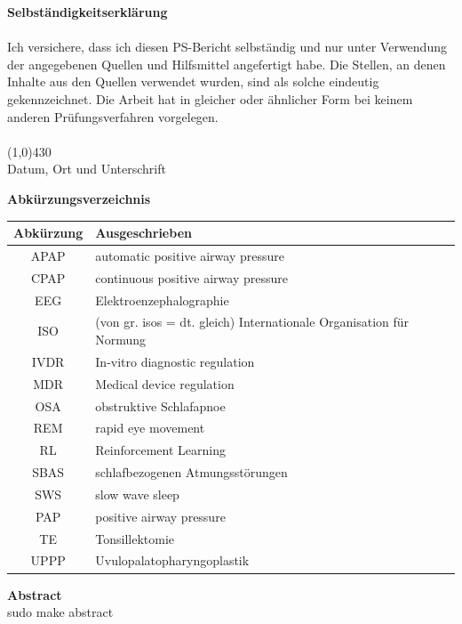 \documentclass[a4paper, 12pt]{article}
\begin{document}
\newpage
{\bfseries \large Selbständigkeitserklärung}\\ \\
Ich versichere, dass ich diesen PS-Bericht selbständig und nur unter Verwendung der angegebenen
Quellen und Hilfsmittel angefertigt habe. Die Stellen, an denen Inhalte aus den Quellen verwendet
wurden, sind als solche eindeutig gekennzeichnet. Die Arbeit hat in gleicher oder ähnlicher Form bei
keinem anderen Prüfungsverfahren vorgelegen. \\
\vspace{1.0cm} \\
\line(1,0){430} \\
Datum, Ort und Unterschrift\\

\newpage


\newpage
{\bfseries \large Abkürzungsverzeichnis}\\
\begin{table}[h!]
\centering
\begin{tabular}{c | l}
\hline
\textbf{Abkürzung} & \textbf{Ausgeschrieben} \\ 
\hline 
APAP & automatic positive airway pressure \\
CPAP & continuous positive airway pressure \\
EEG & Elektroenzephalographie \\
ISO & (von gr. isos = dt. gleich) Internationale Organisation für Normung \\
IVDR & In-vitro diagnostic regulation \\
MDR & Medical device regulation \\
OSA & obstruktive Schlafapnoe \\ 
REM & rapid eye movement \\
RL & Reinforcement Learning \\
SBAS & schlafbezogenen Atmungsstörungen \\ 
SWS & slow wave sleep \\
PAP & positive airway pressure \\
TE & Tonsillektomie \\
UPPP & Uvulopalatopharyngoplastik \\
\end{tabular} 
\end{table}

\newpage
{\bfseries \large Abstract}\\
sudo make abstract 
\end{document}

